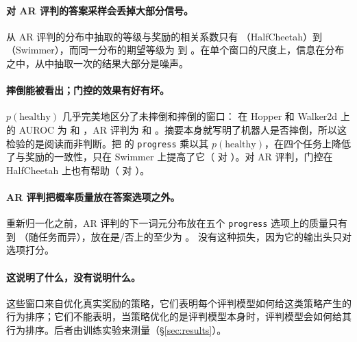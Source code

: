 \paragraph{对 AR 评判的答案采样会丢掉大部分信号。} 从 AR 评判的分布中抽取的等级与奖励的相关系数只有 （HalfCheetah）到 （Swimmer），而同一分布的期望等级为  到 。在单个窗口的尺度上，信息在分布之中，从中抽取一次的结果大部分是噪声。

\paragraph{摔倒能被看出；门控的效果有好有坏。} $p(\text{healthy})$ 几乎完美地区分了未摔倒和摔倒的窗口：\kev{} 在 Hopper 和 Walker2d 上的 AUROC 为  和 ，AR 评判为  和 。摘要本身就写明了机器人是否摔倒，所以这检验的是阅读而非判断。把 \kev{} 的 \texttt{progress} 乘以其 $p(\text{healthy})$，在四个任务上降低了与奖励的一致性，只在 Swimmer 上提高了它（ 对 ）。对 AR 评判，门控在 HalfCheetah 上也有帮助（ 对 ）。

\paragraph{AR 评判把概率质量放在答案选项之外。} 重新归一化之前，AR 评判的下一词元分布放在五个 \texttt{progress} 选项上的质量只有  到 （随任务而异），放在是/否上的至少为 。\kev{} 没有这种损失，因为它的输出头只对选项打分。

\paragraph{这说明了什么，没有说明什么。} 这些窗口来自优化真实奖励的策略，它们表明每个评判模型如何给这类策略产生的行为排序；它们不能表明，当策略优化的是评判模型本身时，评判模型会如何给其行为排序。后者由训练实验来测量（\S\ref{sec:results}）。
